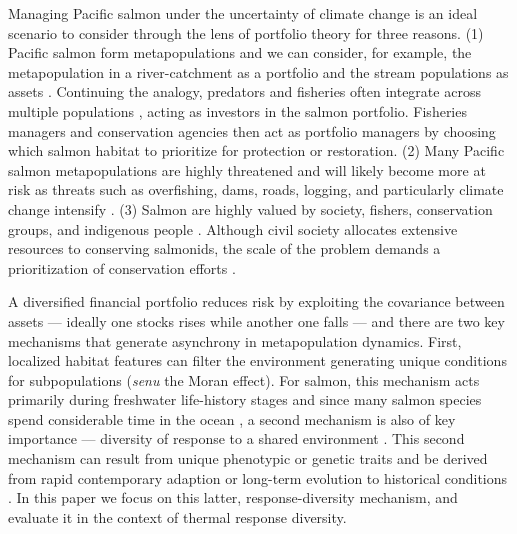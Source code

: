 Managing Pacific salmon under the uncertainty of climate change is an ideal scenario to consider through the lens of portfolio theory for three reasons. (1) Pacific salmon form metapopulations \citep{rieman2000, schtickzelle2007} and we can consider, for example, the metapopulation in a river-catchment as a portfolio and the stream populations as assets \citep{schindler2010, moore2010}. Continuing the analogy, predators and fisheries often integrate across multiple populations \citep{hilborn2003, schindler2008}, acting as investors in the salmon portfolio. Fisheries managers and conservation agencies then act as portfolio managers by choosing which salmon habitat to prioritize for protection or restoration. (2) Many Pacific salmon metapopulations are highly threatened \citep{mcclure2003, gustafson2007, peterman2012} and will likely become more at risk as threats such as overfishing, dams, roads, logging, and particularly climate change intensify \citep[e.g.][]{lackey2003}. (3) Salmon are highly valued by society, fishers, conservation groups, and indigenous people \citep{nrc1996}. Although civil society allocates extensive resources to conserving salmonids, the scale of the problem demands a prioritization of conservation efforts \citep{allendorf1997}.

A diversified financial portfolio reduces risk by exploiting the covariance between assets --- ideally one stocks rises while another one falls --- and there are two key mechanisms that generate asynchrony in metapopulation dynamics. First, localized habitat features can filter the environment generating unique conditions for subpopulations \citep{schindler2008, rogers2008} (\emph{senu} the Moran effect). For salmon, this mechanism acts primarily during freshwater life-history stages and since many salmon species spend considerable time in the ocean \citep{quinn2005}, a second mechanism is also of key importance --- diversity of response to a shared environment \citetext{\citealp[i.e.~response diversity,][]{elmqvist2003}; \citealp[and biocomplexity][]{colwell1998}; \citealp{hilborn2003}}. This second mechanism can result from unique phenotypic or genetic traits \citep{crozier2008, kovach2012} and be derived from rapid contemporary adaption \citep{stockwell2003, fraser2011} or long-term evolution to historical conditions \citep{eliason2011}. In this paper we focus on this latter, response-diversity mechanism, and evaluate it in the context of thermal response diversity.

